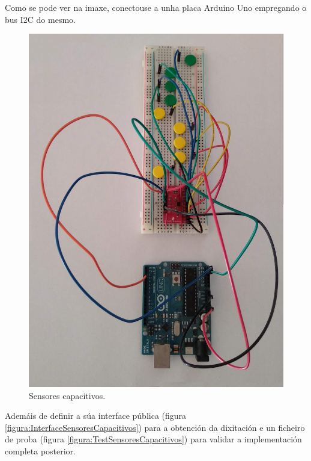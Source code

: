    Como se pode ver na imaxe, conectouse a unha placa Arduino Uno empregando
   o bus I2C do mesmo. \\
  
   \begin{figure}[htbp]
    \centering
    \includegraphics[scale=0.2,keepaspectratio=true]{./imagenes/sensores-capacitivos.jpg}
    \caption{Sensores capacitivos.}
    \label{figura:SensoresCapacitivos}
   \end{figure}
   
   Ademáis de definir a súa interface pública (figura 
   \ref{figura:InterfaceSensoresCapacitivos}) para a obtención da dixitación e
   un ficheiro de proba (figura \ref{figura:TestSensoresCapacitivos}) para
   validar a implementación completa posterior. \\
   
